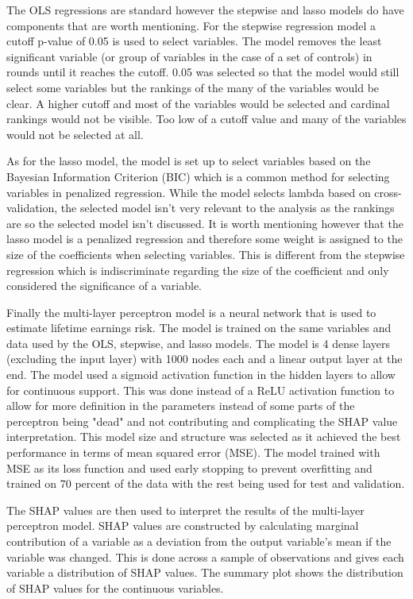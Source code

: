 \documentclass[12pt]{article}
\begin{document}
\begin{onehalfspace}
The OLS regressions are standard however the stepwise and lasso models do have components that are worth mentioning. For the stepwise regression model a cutoff p-value of 0.05 is used to select variables. The model removes the least significant variable (or group of variables in the case of a set of controls) in rounds until it reaches the cutoff. 0.05 was selected so that the model would still select some variables but the rankings of the many of the variables would be clear. A higher cutoff and most of the variables would be selected and cardinal rankings would not be visible. Too low of a cutoff value and many of the variables would not be selected at all. 

As for the lasso model, the model is set up to select variables based on the Bayesian Information Criterion (BIC) which is a common method for selecting variables in penalized regression. While the model selects lambda based on cross-validation, the selected model isn't very relevant to the analysis as the rankings are so the selected model isn't discussed. It is worth mentioning however that the lasso model is a penalized regression and therefore some weight is assigned to the size of the coefficients when selecting variables. This is different from the stepwise regression which is indiscriminate regarding the size of the coefficient and only considered the significance of a variable.

Finally the multi-layer perceptron model is a neural network that is used to estimate lifetime earnings risk. The model is trained on the same variables and data used by the OLS, stepwise, and lasso models. The model is 4 dense layers (excluding the input layer) with 1000 nodes each and a linear output layer at the end. The model used a sigmoid activation function in the hidden layers to allow for continuous support. This was done instead of a ReLU activation function to allow for more definition in the parameters instead of some parts of the perceptron being "dead" and not contributing and complicating the SHAP value interpretation. This model size and structure was selected as it achieved the best performance in terms of mean squared error (MSE). The model trained with MSE as its loss function and used early stopping to prevent overfitting and trained on 70 percent of the data with the rest being used for test and validation.

The SHAP values are then used to interpret the results of the multi-layer perceptron model. SHAP values are constructed by calculating marginal contribution of a variable as a deviation from the output variable's mean if the variable was changed. This is done across a sample of observations and gives each variable a distribution of SHAP values. The summary plot shows the distribution of SHAP values for the continuous variables. 


\end{onehalfspace}
\end{document}
